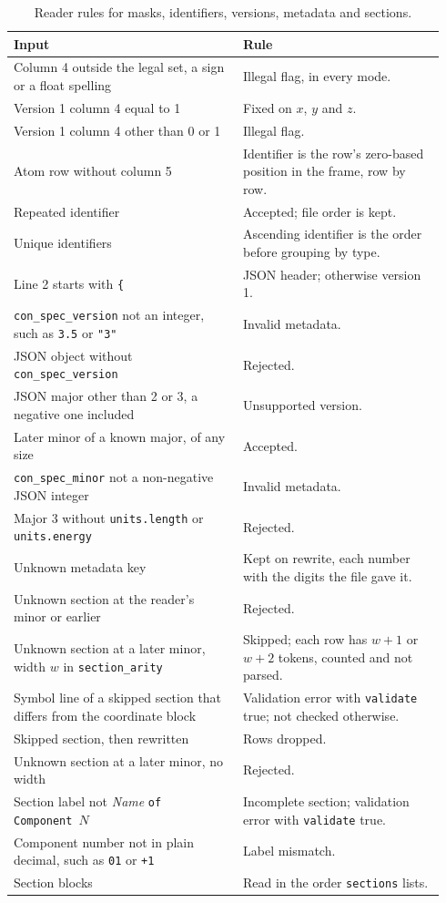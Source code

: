 \documentclass[preprint,12pt]{elsarticle}
\begin{document}
\begin{table}[tbp] \centering \small \caption{Reader rules for masks, identifiers, versions, metadata and sections.}
\label{tab:rules}
\begin{tabular}{@{}p{0.50\linewidth}p{0.44\linewidth}@{}}
\toprule
Input & Rule \\
\midrule
Column 4 outside the legal set, a sign or a float spelling & Illegal flag, in every mode. \\
Version 1 column 4 equal to 1 & Fixed on \(x\), \(y\) and \(z\). \\
Version 1 column 4 other than 0 or 1 & Illegal flag. \\
Atom row without column 5 & Identifier is the row's zero-based position in the frame, row by row. \\
Repeated identifier & Accepted; file order is kept. \\
Unique identifiers & Ascending identifier is the order before grouping by type. \\
Line 2 starts with \texttt{\{} & JSON header; otherwise version 1. \\
\texttt{con\_spec\_version} not an integer, such as \texttt{3.5} or \texttt{"3"} & Invalid metadata. \\
JSON object without \texttt{con\_spec\_version} & Rejected. \\
JSON major other than 2 or 3, a negative one included & Unsupported version. \\
Later minor of a known major, of any size & Accepted. \\
\texttt{con\_spec\_minor} not a non-negative JSON integer & Invalid metadata. \\
Major 3 without \texttt{units.length} or \texttt{units.energy} & Rejected. \\
Unknown metadata key & Kept on rewrite, each number with the digits the file gave it. \\
Unknown section at the reader's minor or earlier & Rejected. \\
Unknown section at a later minor, width \(w\) in \texttt{section\_arity} & Skipped; each row has \(w+1\) or \(w+2\) tokens, counted and not parsed. \\
Symbol line of a skipped section that differs from the coordinate block & Validation error with \texttt{validate} true; not checked otherwise. \\
Skipped section, then rewritten & Rows dropped. \\
Unknown section at a later minor, no width & Rejected. \\
Section label not \emph{Name} \texttt{of Component}~\(N\) & Incomplete section; validation error with \texttt{validate} true. \\
Component number not in plain decimal, such as \texttt{01} or \texttt{+1} & Label mismatch. \\
Section blocks & Read in the order \texttt{sections} lists. \\
\bottomrule
\end{tabular}
\end{table}
\end{document}
